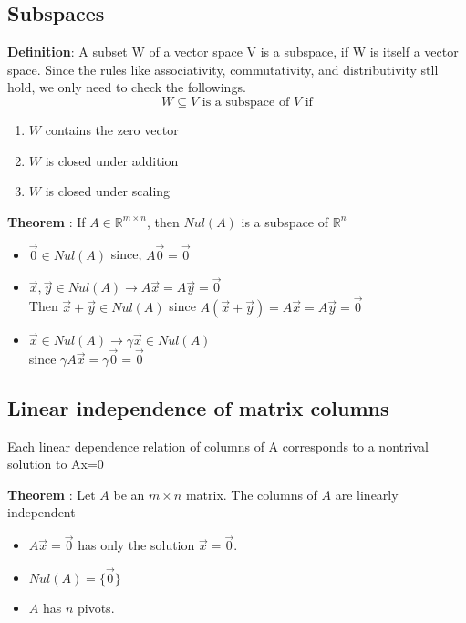 \documentclass{article}
\begin{document}
\subsection{Subspaces}
{

\textbf{Definition}: 
A subset W of a vector space V is a subspace, if W is itself a vector space. Since the rules like associativity, commutativity, and distributivity stll hold, we only need to check the followings.
\[
W \subseteq V \text{  is a subspace of } V \text{ if}
\]

\begin{enumerate}
    \item $W$ contains the zero vector
    \item $W$ is closed under addition
    \item $W$ is closed under scaling
\end{enumerate}


\textbf{Theorem} : If $A \in \mathbb{R}^{m \times n}$, then $Nul(A)$ is a subspace of $\mathbb{R}^{n}$
\begin{itemize}
    \item $\vec{0} \in Nul(A)$ since, $A\vec{0} = \vec{0}$
    \item $\vec{x},\vec{y} \in Nul(A) \rightarrow  A \vec{x} = A \vec{y} = \vec{0} $ \\ Then $\vec{x}+\vec{y} \in Nul(A)$ since $A(\vec{x}+\vec{y}) = A\vec{x} = A\vec{y} = \vec{0}$
    \item $\vec{x} \in Nul(A) \rightarrow  \gamma\vec{x} \in Nul(A) $ \\ since $ \gamma A \vec{x} = \gamma \vec{0} = \vec{0}$
\end{itemize}

}

\subsection{Linear independence of matrix columns}
{
Each linear dependence relation of columns of A corresponds to a nontrival solution to Ax=0


\textbf{Theorem} : Let $A$ be an $m \times n$ matrix. The columns of $A$ are linearly independent
\begin{itemize}
    \item $A \vec{x} = \vec{0}$ has only the solution $\vec{x}=\vec{0}$.
    \item $Nul(A) = \{\vec{0}\}$
    \item $A$ has $n$ pivots.
\end{itemize}
}
\end{document}

